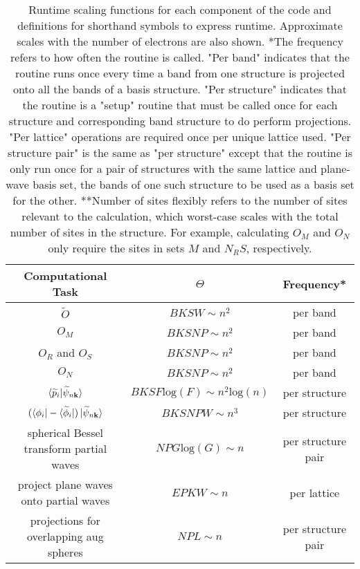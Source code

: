 \documentclass[12pt]{article}
\begin{document}
\begin{table}
\centering
\caption{Runtime scaling functions for each component of the code and
definitions for shorthand symbols to express runtime. Approximate
scales with the number of electrons are also shown.
*The frequency refers to how often the routine is called. "Per band"
indicates that the routine runs once every time a band from one structure
is projected onto all the bands of a basis structure. "Per structure"
indicates that the routine is a "setup" routine that must be called once
for each structure and corresponding band structure to do perform projections. "Per lattice"
operations are required once per unique lattice used.
"Per structure pair" is the same as "per structure" except that the routine
is only run once for a pair of structures with the same lattice and plane-wave
basis set, the bands of one such structure to be used as a basis set for the other.
**Number of sites flexibly refers to the number of sites relevant to the calculation,
which worst-case scales with the total number of sites in the structure. For example,
calculating $O_M$ and $O_N$ only require the sites in sets $M$ and $N_RS$, respectively.}
\label{tab:runtime}

\begin{tabular}{|c|c|c|}
\hline
Computational Task & $\Theta$ & Frequency*\\
\hline
$\widetilde{O}$ & $BKSW \sim n^2$ & per band\\
$O_M$ & $BKSNP \sim n^2$ & per band\\
$O_R$ and $O_S$ & $BKSNP \sim n^2$ & per band\\
$O_N$ & $BKSNP \sim n^2$ & per band\\
$\braket{\widetilde{p}_i|\widetilde{\psi}_{n\mathbf{k}}}$ & $BKSF\mathrm{log}(F)
\sim n^2\mathrm{log}(n)$ & per structure\\
$(\bra{\phi_i}-\bra{\widetilde{\phi}_i})
\ket{\widetilde{\psi}_{n\mathbf{k}}}$ & $BKSNPW \sim n^3$ & per structure\\
spherical Bessel transform partial waves & $NPG\mathrm{log}(G) \sim n$ & per structure pair\\
project plane waves onto partial waves & $EPKW \sim n$ & per lattice\\
projections for overlapping aug spheres & $NPL \sim n$ & per structure pair\\
\hline
\end{tabular}


\end{table}
\end{document}
